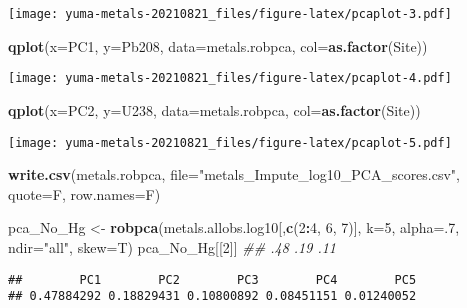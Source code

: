 \documentclass[]{article}
\newenvironment{Shaded}{\begin{snugshade}}{\end{snugshade}}
\newcommand{\CommentTok}[1]{\textcolor[rgb]{0.56,0.35,0.01}{\textit{#1}}}
\newcommand{\DataTypeTok}[1]{\textcolor[rgb]{0.13,0.29,0.53}{#1}}
\newcommand{\DecValTok}[1]{\textcolor[rgb]{0.00,0.00,0.81}{#1}}
\newcommand{\KeywordTok}[1]{\textcolor[rgb]{0.13,0.29,0.53}{\textbf{#1}}}
\newcommand{\NormalTok}[1]{#1}
\newcommand{\OperatorTok}[1]{\textcolor[rgb]{0.81,0.36,0.00}{\textbf{#1}}}
\newcommand{\StringTok}[1]{\textcolor[rgb]{0.31,0.60,0.02}{#1}}
\begin{document}
\texttt{[image: yuma-metals-20210821\_files/figure-latex/pcaplot-3.pdf]}

\begin{Shaded}
\begin{Highlighting}[]
\KeywordTok{qplot}\NormalTok{(}\DataTypeTok{x=}\NormalTok{PC1, }\DataTypeTok{y=}\NormalTok{Pb208, }\DataTypeTok{data=}\NormalTok{metals.robpca, }\DataTypeTok{col=}\KeywordTok{as.factor}\NormalTok{(Site))}
\end{Highlighting}
\end{Shaded}

\texttt{[image: yuma-metals-20210821\_files/figure-latex/pcaplot-4.pdf]}

\begin{Shaded}
\begin{Highlighting}[]
\KeywordTok{qplot}\NormalTok{(}\DataTypeTok{x=}\NormalTok{PC2, }\DataTypeTok{y=}\NormalTok{U238, }\DataTypeTok{data=}\NormalTok{metals.robpca, }\DataTypeTok{col=}\KeywordTok{as.factor}\NormalTok{(Site))}
\end{Highlighting}
\end{Shaded}

\texttt{[image: yuma-metals-20210821\_files/figure-latex/pcaplot-5.pdf]}

\begin{Shaded}
\begin{Highlighting}[]
\KeywordTok{write.csv}\NormalTok{(metals.robpca, }\DataTypeTok{file=}\StringTok{"metals_Impute_log10_PCA_scores.csv"}\NormalTok{, }\DataTypeTok{quote=}\NormalTok{F, }\DataTypeTok{row.names=}\NormalTok{F)}
\end{Highlighting}
\end{Shaded}

\begin{Shaded}
\begin{Highlighting}[]
\NormalTok{pca_No_Hg <-}\StringTok{ }\KeywordTok{robpca}\NormalTok{(metals.allobs.log10[,}\KeywordTok{c}\NormalTok{(}\DecValTok{2}\OperatorTok{:}\DecValTok{4}\NormalTok{, }\DecValTok{6}\NormalTok{, }\DecValTok{7}\NormalTok{)], }\DataTypeTok{k=}\DecValTok{5}\NormalTok{, }\DataTypeTok{alpha=}\NormalTok{.}\DecValTok{7}\NormalTok{, }\DataTypeTok{ndir=}\StringTok{"all"}\NormalTok{,}
                    \DataTypeTok{skew=}\NormalTok{T)}
\NormalTok{pca_No_Hg[[}\DecValTok{2}\NormalTok{]] }\CommentTok{## .48  .19 .11}
\end{Highlighting}
\end{Shaded}

\begin{verbatim}
##        PC1        PC2        PC3        PC4        PC5 
## 0.47884292 0.18829431 0.10800892 0.08451151 0.01240052
\end{verbatim}
\end{document}
